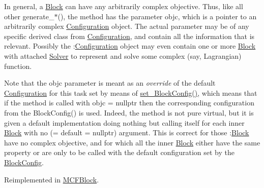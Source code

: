 In general, a \mbox{\hyperlink{class_s_m_spp__di__unipi__it_1_1_block}{Block}} can have any arbitrarily complex objective. Thus, like all other generate\+\_\+$\ast$(), the method has the parameter objc, which is a pointer to an arbitrarily complex \mbox{\hyperlink{class_s_m_spp__di__unipi__it_1_1_configuration}{Configuration}} object. The actual parameter may be of any specific derived class from \mbox{\hyperlink{class_s_m_spp__di__unipi__it_1_1_configuration}{Configuration}}, and contain all the information that is relevant. Possibly the \+:\mbox{\hyperlink{class_s_m_spp__di__unipi__it_1_1_configuration}{Configuration}} object may even contain one or more \mbox{\hyperlink{class_s_m_spp__di__unipi__it_1_1_block}{Block}} with attached \mbox{\hyperlink{class_s_m_spp__di__unipi__it_1_1_solver}{Solver}} to represent and solve some complex (say, Lagrangian) function.

Note that the objc parameter is meant as an {\itshape override} of the default \mbox{\hyperlink{class_s_m_spp__di__unipi__it_1_1_configuration}{Configuration}} for this task set by means of \mbox{\hyperlink{class_s_m_spp__di__unipi__it_1_1_block_a18d411b740a47db00d15083c5c7ef2ba}{set\+\_\+\+Block\+Config()}}, which means that if the method is called with objc = nullptr then the corresponding configuration from the Block\+Config() is used. Indeed, the method is not pure virtual, but it is given a default implementation doing nothing but calling itself for each inner \mbox{\hyperlink{class_s_m_spp__di__unipi__it_1_1_block}{Block}} with no (= default = nullptr) argument. This is correct for those \+:\mbox{\hyperlink{class_s_m_spp__di__unipi__it_1_1_block}{Block}} have no complex objective, and for which all the inner \mbox{\hyperlink{class_s_m_spp__di__unipi__it_1_1_block}{Block}} either have the same property or are only to be called with the default configuration set by the \mbox{\hyperlink{class_s_m_spp__di__unipi__it_1_1_block_config}{Block\+Config}}. 

Reimplemented in \mbox{\hyperlink{class_s_m_spp__di__unipi__it_1_1_m_c_f_block_aa2b7e92a516434c33f247eef8574fb94}{M\+C\+F\+Block}}.

\mbox{\label{class_s_m_spp__di__unipi__it_1_1_block_add9b4c918157bda66b5183f67953d49b}} 
